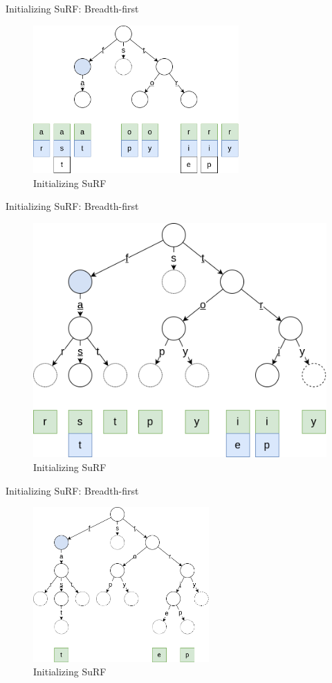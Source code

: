 \documentclass{beamer}
\begin{document}
\begin{frame}{Initializing SuRF: Breadth-first}
		\begin{figure}
				\centering
				\includegraphics[width=0.7\textwidth]{resources/initializing_surf_3}
				\caption{Initializing SuRF}
		\end{figure}
\end{frame}

\begin{frame}{Initializing SuRF: Breadth-first}
		\begin{figure}
				\centering
				\includegraphics[height=0.6\textwidth]{resources/initializing_surf_4}
				\caption{Initializing SuRF}
		\end{figure}
\end{frame}

\begin{frame}{Initializing SuRF: Breadth-first}
		\begin{figure}
				\centering
				\includegraphics[width=0.6\textwidth]{resources/initializing_surf_5}
				\caption{Initializing SuRF}
		\end{figure}
\end{frame}
\end{document}
